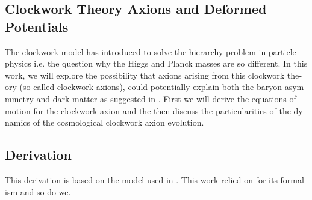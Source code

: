 \documentclass[master,       %
               twoside,        %
               BCOR10mm,       %
               english,ngerman, %
               ]{GAUBM}
\begin{document}
\begin{otherlanguage}{english}
\section{Clockwork Theory Axions and Deformed Potentials}
The clockwork model has introduced to solve the hierarchy problem in particle physics i.e. the question why the Higgs and Planck masses are so different. In this work, we will explore the possibility that axions arising from this clockwork theory (so called clockwork axions), could potentially explain both the baryon asymmmetry and dark matter as suggested in  \cite{Deformed_potential_Bae_2019}. First we will derive the equations of motion for the clockwork axion and the then discuss the particularities of the dynamics of the cosmological clockwork axion evolution.

\subsection{Derivation}
This derivation is based on the model used in \cite{Deformed_potential_Bae_2019}. This work relied on \cite{general_cont_clockwork_Choi_2018} for its formalism and so do we.


\end{otherlanguage}
\end{document}
